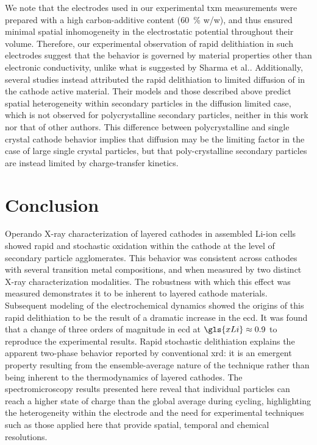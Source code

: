\documentclass{article}
\begin{document}
We note that the electrodes used in our experimental \gls{txm}
measurements were prepared with a high carbon-additive content
(\SI{60}{\percent} w/w), and thus ensured minimal spatial
inhomogeneity in the electrostatic potential throughout their
volume. Therefore, our experimental observation of rapid delithiation
in such electrodes suggest that the behavior is governed by material
properties other than electronic conductivity, unlike what is
suggested by Sharma et al.\cite{zhao2022}. Additionally, several
studies instead attributed the rapid delithiation to limited diffusion
of  in the cathode active material\cite{rao2021,
  wang2020-6}. Their models and those described above predict spatial
heterogeneity within secondary particles in the diffusion limited
case\cite{wang2020-6}, which is not observed for polycrystalline
secondary particles, neither in this work nor that of other
authors\cite{chueh2021, zhao2022}. This difference between
polycrystalline and single crystal cathode behavior implies that
 diffusion may be the limiting factor in the case of large
single crystal particles, but that poly-crystalline secondary
particles are instead limited by charge-transfer kinetics.
 



\section{Conclusion}

Operando X-ray characterization of layered cathodes in assembled
Li-ion cells showed rapid and stochastic oxidation within the cathode
at the level of secondary particle agglomerates. This behavior was
consistent across cathodes with several transition metal compositions,
and when measured by two distinct X-ray characterization
modalities. The robustness with which this effect was measured
demonstrates it to be inherent to layered cathode
materials. Subsequent modeling of the electrochemical dynamics showed
the origins of this rapid delithiation to be the result of a dramatic
increase in the \gls{ecd}. It was found that a change of three orders
of magnitude in \gls{ecd} at $\gls{xLi}\approx 0.9$ to reproduce the
experimental results. Rapid stochastic delithiation explains the
apparent two-phase behavior reported by conventional \gls{xrd}: it is
an emergent property resulting from the ensemble-average nature of the
technique rather than being inherent to the thermodynamics of layered
cathodes. The spectromicroscopy results presented here reveal that
individual particles can reach a higher state of charge than the
global average during cycling, highlighting the heterogeneity within
the electrode and the need for experimental techniques such as those
applied here that provide spatial, temporal and chemical resolutions.
\end{document}
